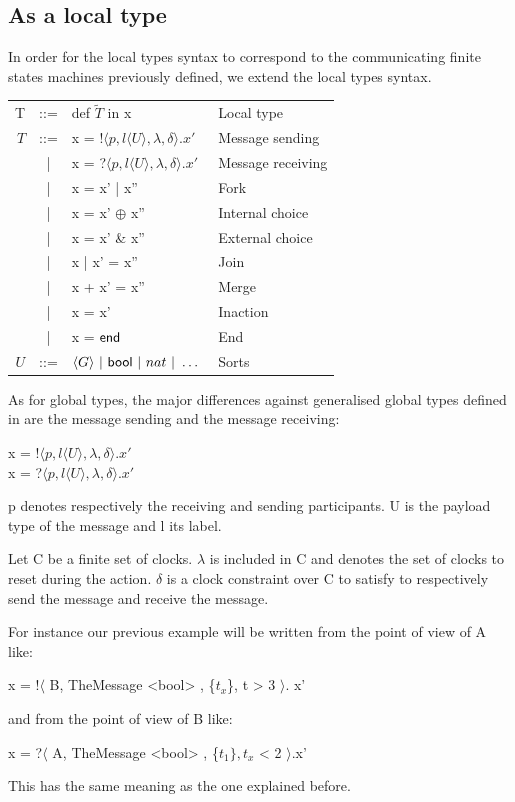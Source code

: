 \documentclass[a4paper,11pt,twoside]{report}
\newcommand{\kf}[1]{\textup{\textsf{#1}}\xspace}
\newcommand{\T}{\ensuremath{T}}
\newcommand{\UT}{\ensuremath{U}}
\newcommand{\End}{\kf{end}}
\newcommand{\Bool}{\kf{bool}}
\begin{document}
\subsection{As a local type}
In order for the local types syntax to correspond to the communicating finite states machines previously defined, we extend the local types syntax.
\begin{center}
\begin{tabular}{rcll}
T & ::= & def $\tilde{\T}$ in x & Local type \\
$\T$ & ::= & x  = !$\langle p,  l \langle \UT \rangle, \lambda, \delta \rangle.x' $ & Message sending\\
& | & x  = ?$\langle p,  l \langle \UT \rangle, \lambda, \delta \rangle.x' $ & Message receiving\\
& | & x = x' | x'' & Fork\\
& | & x = x' $\oplus$ x'' & Internal choice\\ 
& | & x = x' \& x'' & External choice\\
& | & x | x' = x'' & Join\\
& | & x + x' = x'' & Merge\\
& | & x = x' & Inaction\\
& | & x = $\End$ & End\\
\UT & ::= &$ \langle G\rangle\ |\ \Bool\ |\ nat \ |\ \ldots\ $ & Sorts
\end{tabular}
\end{center}
As for global types, the major differences against generalised global types defined in \cite{denielou2012multiparty} are the message sending and the message receiving:
\begin{center}
x  = !$\langle p,  l \langle \UT \rangle, \lambda, \delta \rangle.x' $\\
x  = ?$\langle p,  l \langle \UT \rangle, \lambda, \delta \rangle.x' $ 
\end{center}
p denotes respectively the receiving and sending participants. U is the payload type of the message and l its label. 

Let C be a finite set of clocks. $\lambda$ is included in C and denotes the set of clocks to reset during the action.  $\delta$ is a clock constraint over C to satisfy to respectively send the message and receive the message.

For instance our previous example will be written from the point of view of A like:
\begin{center}
x = !$\langle$ B, TheMessage <bool> , \{$t_{x}$\}, t > 3 $\rangle$. x’ 
\end{center}
and from the point of view of B like:
\begin{center}
x = ?$\langle$ A, TheMessage <bool> , \{$t_1\}, t_{x}$ < 2 $\rangle$.x’ 
\end{center}
This has the same meaning as the one explained before.
\end{document}
